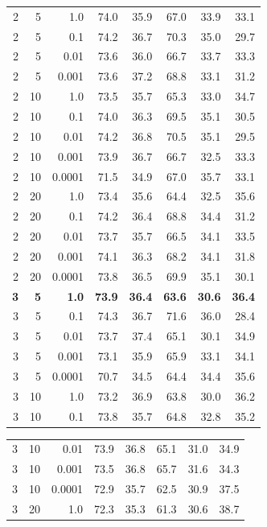 \documentclass[12pt, a4paper]{article}
\begin{document}
\begin{table}[ht]
\begin{minipage}[t]{0.48\textwidth}
\begin{tabular}{rrrrrrrr}
\midrule
2 & 5 & 1.0 & 74.0 & 35.9 & 67.0 & 33.9 & 33.1 \\
2 & 5 & 0.1 & 74.2 & 36.7 & 70.3 & 35.0 & 29.7 \\
2 & 5 & 0.01 & 73.6 & 36.0 & 66.7 & 33.7 & 33.3 \\
2 & 5 & 0.001 & 73.6 & 37.2 & 68.8 & 33.1 & 31.2 \\
2 & 10 & 1.0 & 73.5 & 35.7 & 65.3 & 33.0 & 34.7 \\
2 & 10 & 0.1 & 74.0 & 36.3 & 69.5 & 35.1 & 30.5 \\
2 & 10 & 0.01 & 74.2 & 36.8 & 70.5 & 35.1 & 29.5 \\
2 & 10 & 0.001 & 73.9 & 36.7 & 66.7 & 32.5 & 33.3 \\
2 & 10 & 0.0001 & 71.5 & 34.9 & 67.0 & 35.7 & 33.1 \\
2 & 20 & 1.0 & 73.4 & 35.6 & 64.4 & 32.5 & 35.6 \\
2 & 20 & 0.1 & 74.2 & 36.4 & 68.8 & 34.4 & 31.2 \\
2 & 20 & 0.01 & 73.7 & 35.7 & 66.5 & 34.1 & 33.5 \\
2 & 20 & 0.001 & 74.1 & 36.3 & 68.2 & 34.1 & 31.8 \\
2 & 20 & 0.0001 & 73.8 & 36.5 & 69.9 & 35.1 & 30.1 \\
\midrule
\textbf{3} & \textbf{5} & \textbf{1.0} & \textbf{73.9} & \textbf{36.4} & \textbf{63.6} & \textbf{30.6} & \textbf{36.4} \\
3 & 5 & 0.1 & 74.3 & 36.7 & 71.6 & 36.0 & 28.4 \\
3 & 5 & 0.01 & 73.7 & 37.4 & 65.1 & 30.1 & 34.9 \\
3 & 5 & 0.001 & 73.1 & 35.9 & 65.9 & 33.1 & 34.1 \\
3 & 5 & 0.0001 & 70.7 & 34.5 & 64.4 & 34.4 & 35.6 \\
3 & 10 & 1.0 & 73.2 & 36.9 & 63.8 & 30.0 & 36.2 \\
3 & 10 & 0.1 & 73.8 & 35.7 & 64.8 & 32.8 & 35.2 \\
\bottomrule
\end{tabular}
\end{minipage}
\hfill
\begin{minipage}[t]{0.48\textwidth}
\begin{tabular}{rrrrrrrr}
\toprule
3 & 10 & 0.01 & 73.9 & 36.8 & 65.1 & 31.0 & 34.9 \\
3 & 10 & 0.001 & 73.5 & 36.8 & 65.7 & 31.6 & 34.3 \\
3 & 10 & 0.0001 & 72.9 & 35.7 & 62.5 & 30.9 & 37.5 \\
3 & 20 & 1.0 & 72.3 & 35.3 & 61.3 & 30.6 & 38.7 \\

\end{tabular}
\end{minipage}
\end{table}
\end{document}
